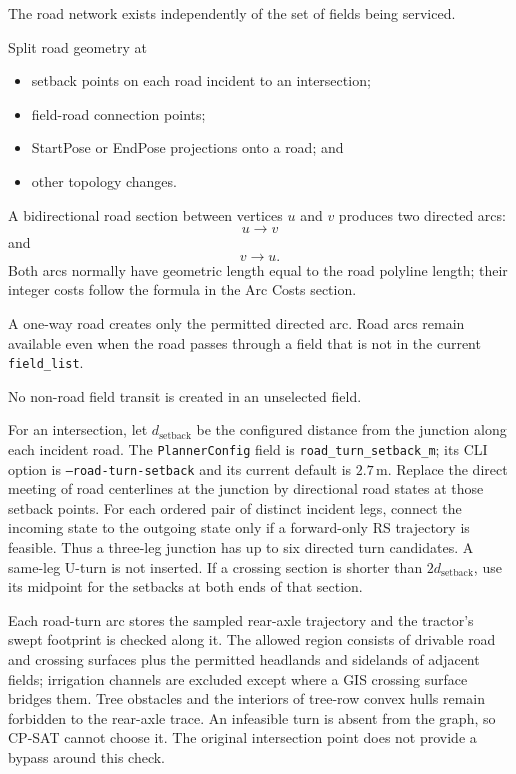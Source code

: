 \documentclass{article}
\begin{document}
The road network exists independently of the set of fields being serviced.

Split road geometry at

\begin{itemize}
\item setback points on each road incident to an intersection;
\item field-road connection points;
\item StartPose or EndPose projections onto a road; and
\item other topology changes.
\end{itemize}

A bidirectional road section between vertices $u$ and $v$ produces two directed arcs:
$$
u\rightarrow v
$$
and
$$
v\rightarrow u.
$$
Both arcs normally have geometric length equal to the road polyline length; their integer costs follow the formula in the Arc Costs section.

A one-way road creates only the permitted directed arc.
Road arcs remain available even when the road passes through a field that is not in the current \texttt{field\_list}.

No non-road field transit is created in an unselected field.

For an intersection, let $d_{\mathrm{setback}}$ be the configured distance from the junction along each incident road. The \texttt{PlannerConfig} field is \texttt{road\_turn\_setback\_m}; its CLI option is \texttt{--road-turn-setback} and its current default is $2.7\,$m. Replace the direct meeting of road centerlines at the junction by directional road states at those setback points. For each ordered pair of distinct incident legs, connect the incoming state to the outgoing state only if a forward-only RS trajectory is feasible. Thus a three-leg junction has up to six directed turn candidates. A same-leg U-turn is not inserted. If a crossing section is shorter than $2d_{\mathrm{setback}}$, use its midpoint for the setbacks at both ends of that section.

Each road-turn arc stores the sampled rear-axle trajectory and the tractor's swept footprint is checked along it. The allowed region consists of drivable road and crossing surfaces plus the permitted headlands and sidelands of adjacent fields; irrigation channels are excluded except where a GIS crossing surface bridges them. Tree obstacles and the interiors of tree-row convex hulls remain forbidden to the rear-axle trace. An infeasible turn is absent from the graph, so CP-SAT cannot choose it. The original intersection point does not provide a bypass around this check.
\end{document}
